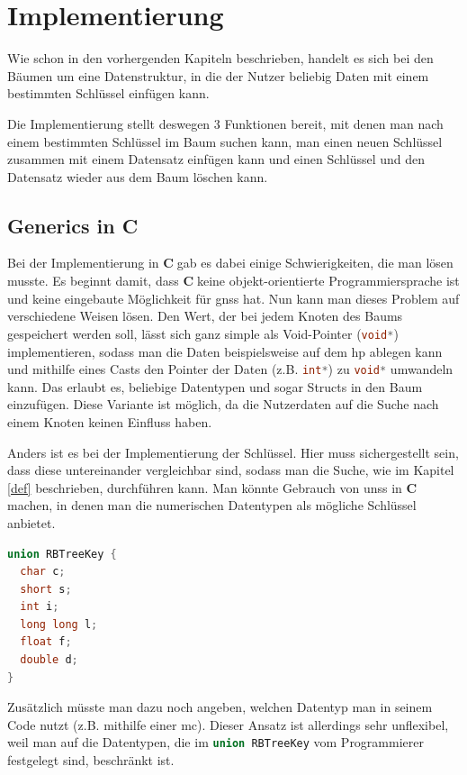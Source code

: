 \documentclass[11pt]{article}
\newcommand{\lstin}[1]{\lstinline[language=C]{#1}}
\newcommand{\cpl}{\textbf{C}$\;$}
\begin{document}
\pagebreak
\section{Implementierung} \label{impl}
Wie schon in den vorhergenden Kapiteln beschrieben, handelt es sich bei den Bäumen um eine Datenstruktur, in die der Nutzer beliebig Daten mit einem bestimmten Schlüssel einfügen kann.

Die Implementierung stellt deswegen 3 Funktionen bereit, mit denen man nach einem bestimmten Schlüssel im Baum suchen kann, man einen neuen Schlüssel zusammen mit einem Datensatz einfügen kann und einen Schlüssel und den Datensatz wieder aus dem Baum löschen kann.

\subsection{Generics in C}
Bei der Implementierung in \cpl gab es dabei einige Schwierigkeiten, die man lösen musste. Es beginnt damit, dass \cpl keine objekt-orientierte Programmiersprache ist und keine eingebaute Möglichkeit für \glspl{gns} hat.
Nun kann man dieses Problem auf verschiedene Weisen lösen. Den Wert, der bei jedem Knoten des Baums gespeichert werden soll, lässt sich ganz simple als Void-Pointer (\lstin{void*}) implementieren, sodass man die Daten beispielsweise auf dem \gls{hp} ablegen kann
und mithilfe eines Casts den Pointer der Daten (z.B. \lstin{int*}) zu \lstin{void*} umwandeln kann. Das erlaubt es, beliebige Datentypen und sogar Structs in den Baum einzufügen.
Diese Variante ist möglich, da die Nutzerdaten auf die Suche nach einem Knoten keinen Einfluss haben.

Anders ist es bei der Implementierung der Schlüssel. Hier muss sichergestellt sein, dass diese untereinander vergleichbar sind, sodass man die Suche, wie im Kapitel \ref{def} beschrieben, durchführen kann.
Man könnte Gebrauch von \glspl{uns} in \cpl machen, in denen man die numerischen Datentypen als mögliche Schlüssel anbietet.

\begin{lstlisting}[language=C]
union RBTreeKey {
  char c;
  short s;
  int i;
  long long l;
  float f;
  double d;
}
\end{lstlisting}

Zusätzlich müsste man dazu noch angeben, welchen Datentyp man in seinem Code nutzt (z.B. mithilfe einer \gls{mc}). Dieser Ansatz ist allerdings sehr unflexibel, weil man auf die Datentypen, die im \lstin{union RBTreeKey} vom Programmierer festgelegt sind, beschränkt ist.
\end{document}
